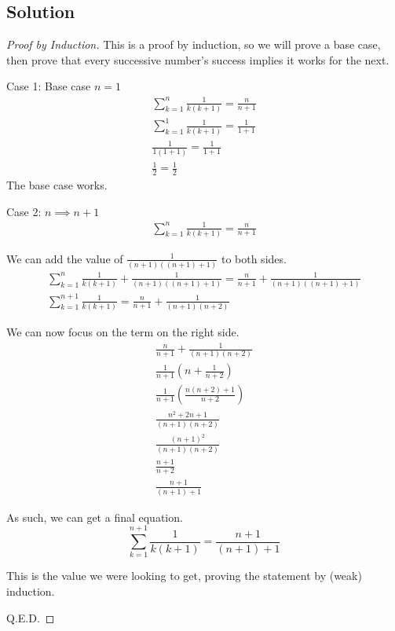 \documentclass[12pt]{report}
\begin{document}
\subsection*{Solution}
\begin{proof}[Proof by Induction]
    This is a proof by induction, so we will prove a base case, then prove that every successive number's success implies it works for the next.

    Case 1: Base case $n = 1$
    \begin{gather}
        \sum^{n}_{k = 1}\frac{1}{k(k + 1)} = \frac{n}{n + 1}\\
        \sum^{1}_{k = 1}\frac{1}{k(k + 1)} = \frac{1}{1 + 1}\\
        \frac{1}{1(1 + 1)} = \frac{1}{1 + 1}\\
        \frac{1}{2} = \frac{1}{2}
    \end{gather}
    The base case works.

    Case 2: $n \implies n + 1$
    \begin{gather}
        \sum^{n}_{k = 1}\frac{1}{k(k + 1)} = \frac{n}{n + 1}
    \end{gather}

    We can add the value of $\frac{1}{(n + 1)((n + 1) + 1)}$ to both sides.
    \begin{gather}
        \sum^{n}_{k = 1}\frac{1}{k(k + 1)} + \frac{1}{(n + 1)((n + 1) + 1)} = \frac{n}{n + 1} + \frac{1}{(n + 1)((n + 1) + 1)}\\
        \sum^{n + 1}_{k = 1}\frac{1}{k(k + 1)} = \frac{n}{n + 1} + \frac{1}{(n + 1)(n + 2)}
    \end{gather}

    We can now focus on the term on the right side.
    \begin{gather}
        \frac{n}{n + 1} + \frac{1}{(n + 1)(n + 2)}\\
        \frac{1}{n + 1}\left( n + \frac{1}{n + 2} \right)\\
        \frac{1}{n + 1}\left( \frac{n(n + 2) + 1}{n + 2} \right)\\
        \frac{n^2 + 2n + 1}{(n + 1)(n + 2)}\\
        \frac{(n + 1)^2}{(n + 1)(n + 2)}\\
        \frac{n + 1}{n + 2}\\
        \frac{n + 1}{(n + 1) + 1}
    \end{gather}

    As such, we can get a final equation.
    \begin{equation}
        \sum^{n + 1}_{k = 1}\frac{1}{k(k + 1)} = \frac{n + 1}{(n + 1) + 1}
    \end{equation}

    This is the value we were looking to get, proving the statement by (weak) induction.

    Q.E.D.
\end{proof}
\end{document}
